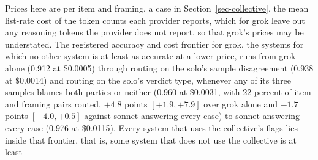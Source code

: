 Prices here are per item and framing, a case in Section~\ref{sec-collective},
the mean list-rate cost of the token
counts each provider reports, which for grok leave out any reasoning tokens
the provider does not report, so that grok's prices may be understated. The
registered accuracy and cost frontier for grok, the systems for which no
other system is at least as accurate at a lower price, runs from grok alone
(0.912 at \$0.0005) through routing on the solo's sample disagreement (0.938
at \$0.0014) and routing on the solo's verdict type, whenever any of its three
samples blames both parties or neither (0.960 at \$0.0031, with 22 percent of item and framing
pairs routed, $+4.8$ points $[+1.9, +7.9]$ over grok alone and $-1.7$ points
$[-4.0, +0.5]$ against sonnet answering every case) to sonnet answering every
case (0.976 at \$0.0115).
Every system that uses the collective's flags lies inside that
frontier, that is, some system that does not use the collective is at least
